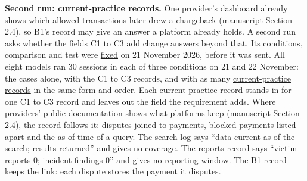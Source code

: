 \documentclass[
  11pt,
]{article}
\begin{document}
\textbf{Second run: current-practice records.} One provider's dashboard
already shows which allowed transactions later drew a chargeback
(manuscript Section 2.4), so B1's record may give an answer a platform
already holds. A second run asks whether the fields C1 to C3 add change
answers beyond that. Its conditions, comparison and test were
\href{tools/agent_test/README.md}{fixed} on 21 November 2026, before it
was sent. All eight models ran 30 sessions in each of three conditions
on 21 and 22 November: the cases alone, with the C1 to C3 records, and
with as many \href{tools/agent_test/PRACTICE.md}{current-practice
records} in the same form and order. Each current-practice record stands
in for one C1 to C3 record and leaves out the field the requirement
adds. Where providers' public documentation shows what platforms keep
(manuscript Section 2.4), the record follows it: disputes joined to
payments, blocked payments listed apart and the as-of time of a query.
The search log says ``data current as of the search; results returned''
and gives no coverage. The reports record says ``victim reports 0;
incident findings 0'' and gives no reporting window. The B1 record keeps
the link: each dispute stores the payment it disputes.
\end{document}
